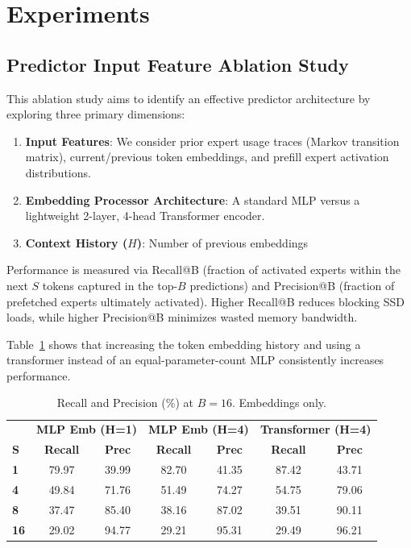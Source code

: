 \section{Experiments}

\subsection{Predictor Input Feature Ablation Study} \label{sec:ablation_study}

This ablation study aims to identify an effective predictor architecture by exploring three primary dimensions:
\begin{enumerate}
    \item \textbf{Input Features}: We consider prior expert usage traces (Markov transition matrix), current/previous token embeddings, and prefill expert activation distributions.
    \item \textbf{Embedding Processor Architecture}:  A standard MLP versus a lightweight 2-layer, 4-head Transformer encoder.
    \item \textbf{Context History ($H$)}: Number of previous embeddings
\end{enumerate}

Performance is measured via Recall@B (fraction of activated experts within the next $S$ tokens captured in the top-$B$ predictions) and Precision@B (fraction of prefetched experts ultimately activated). Higher Recall@B reduces blocking SSD loads, while higher Precision@B minimizes wasted memory bandwidth.


Table~\ref{tab:arch_ablation_b16} shows that increasing the token embedding history and using a transformer instead of an equal-parameter-count MLP consistently increases performance. 


\begin{table}[h]
\centering
\caption{Recall and Precision (\%) at $B=16$. Embeddings only.}
\label{tab:arch_ablation_b16}
\begin{tabular}{l|cc|cc|cc}
\toprule
& \multicolumn{2}{c|}{\textbf{MLP Emb (H=1)}} & \multicolumn{2}{c|}{\textbf{MLP Emb (H=4)}} & \multicolumn{2}{c}{\textbf{Transformer (H=4)}} \\
\textbf{S} & \textbf{Recall} & \textbf{Prec} & \textbf{Recall} & \textbf{Prec} & \textbf{Recall} & \textbf{Prec} \\
\midrule
\textbf{1}  & 79.97 & 39.99 & 82.70 & 41.35 & 87.42 & 43.71 \\
\textbf{4}  & 49.84 & 71.76 & 51.49 & 74.27 & 54.75 & 79.06 \\
\textbf{8}  & 37.47 & 85.40 & 38.16 & 87.02 & 39.51 & 90.11 \\
\textbf{16} & 29.02 & 94.77 & 29.21 & 95.31 & 29.49 & 96.21 \\
\bottomrule
\end{tabular}
\end{table}

